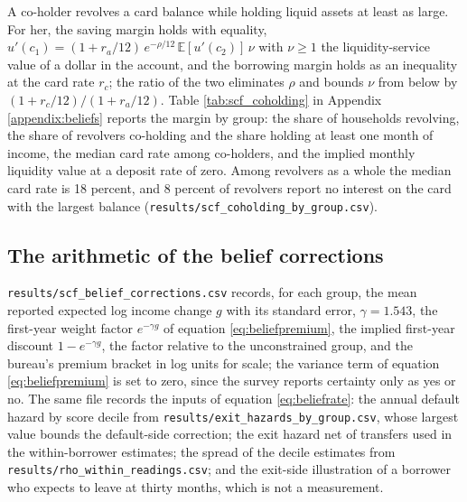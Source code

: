 A co-holder revolves a card balance while holding liquid assets at least as large. For her, the saving margin holds with equality, $u'(c_{1}) = (1 + r_{a}/12)\,e^{-\rho/12}\,\mathbb{E}[u'(c_{2})]\,\nu$ with $\nu \ge 1$ the liquidity-service value of a dollar in the account, and the borrowing margin holds as an inequality at the card rate $r_{c}$; the ratio of the two eliminates $\rho$ and bounds $\nu$ from below by $(1 + r_{c}/12)/(1 + r_{a}/12)$. Table \ref{tab:scf_coholding} in Appendix \ref{appendix:beliefs} reports the margin by group: the share of households revolving, the share of revolvers co-holding and the share holding at least one month of income, the median card rate among co-holders, and the implied monthly liquidity value at a deposit rate of zero. Among revolvers as a whole the median card rate is 18 percent, and 8 percent of revolvers report no interest on the card with the largest balance (\texttt{results/scf\_coholding\_by\_group.csv}).

\subsection{The arithmetic of the belief corrections}

\texttt{results/scf\_belief\_corrections.csv} records, for each group, the mean reported expected log income change $g$ with its standard error, $\gamma = 1.543$, the first-year weight factor $e^{-\gamma g}$ of equation \eqref{eq:beliefpremium}, the implied first-year discount $1 - e^{-\gamma g}$, the factor relative to the unconstrained group, and the bureau's premium bracket in log units for scale; the variance term of equation \eqref{eq:beliefpremium} is set to zero, since the survey reports certainty only as yes or no. The same file records the inputs of equation \eqref{eq:beliefrate}: the annual default hazard by score decile from \texttt{results/exit\_hazards\_by\_group.csv}, whose largest value bounds the default-side correction; the exit hazard net of transfers used in the within-borrower estimates; the spread of the decile estimates from \texttt{results/rho\_within\_readings.csv}; and the exit-side illustration of a borrower who expects to leave at thirty months, which is not a measurement.
